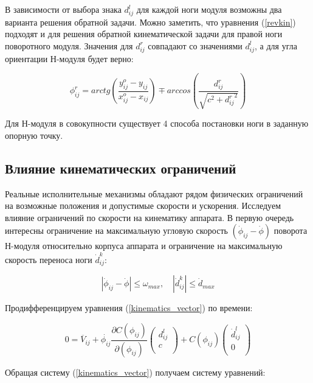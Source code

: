 В зависимости от выбора знака $d^l_{ij}$ для каждой ноги модуля возможны два варианта решения обратной задачи. Можно заметить, что уравнения (\ref{revkin}) подходят и для решения обратной кинематической задачи для правой ноги поворотного модуля. Значения для $d^r_{ij}$ совпадают со значениями $d^l_{ij}$, а для угла ориентации Н-модуля будет верно: 


\begin{equation}
\phi^r_{ij} = arctg\left(\dfrac{y^o_{ij}-y_{ij}}{x^o_{ij}-x_{ij}}\right) \mp arccos\left(\dfrac{d^r_{ij}}{\sqrt{c^2+{d^r_{ij}}^2}}\right)
\end{equation}

Для Н-модуля в совокупности существует 4 способа постановки ноги в заданную опорную точку.


\subsection{Влияние кинематических ограничений}
Реальные исполнительные механизмы обладают рядом физических ограничений на возможные положения и допустимые скорости и ускорения. Исследуем влияние ограничений по скорости на кинематику аппарата.
В первую очередь интересны ограничение на максимальную угловую скорость $(\dot{\phi}_{ij}-\dot{\phi})$ поворота Н-модуля относительно корпуса аппарата и ограничение на максимальную скорость переноса ноги $\dot{d}^k_{ij}$:

\begin{equation}\label{limitations}
	|\dot{\phi}_{ij}-\dot{\phi}| \leq \omega_{max},\quad|\dot{d}^k_{ij}|\leq \dot{d}_{max}
\end{equation}


Продифференцируем уравнения (\ref{kinematics_vector}) по времени:

\begin{equation}
\label{kinematics_diff}
0 = \overline{V}_{ij}+\dot{\phi_{ij}}\dfrac{\partial{C(\phi_{ij})}}{\partial(\phi_{ij})}
	\left(\begin{array}{c}
	d^l_{ij}\\
	c\\
	\end{array}\right)
	+C(\phi_{ij})\left(\begin{array}{c}
	\dot{d}^l_{ij}\\
	0\\
	\end{array}\right)
\end{equation}

Обращая систему (\ref{kinematics_vector}) получаем систему уравнений:

